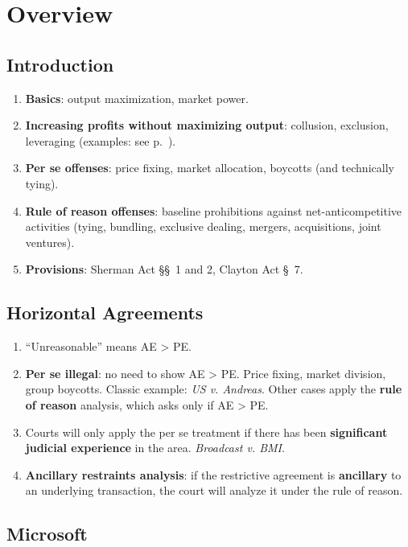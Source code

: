 \section{Overview}

\subsection{Introduction} 

\begin{enumerate}
    \item \textbf{Basics}: output maximization, market power.
    \item \textbf{Increasing profits without maximizing output}: collusion, 
    exclusion, leveraging (examples: see p.~\pageref{sub:conduct-examples}).
    \item \textbf{Per se offenses}: price fixing, market allocation, boycotts 
    (and technically tying).
    \item \textbf{Rule of reason offenses}: baseline prohibitions against 
    net-anticompetitive activities (tying, bundling, exclusive dealing, 
    mergers, acquisitions, joint ventures).
    \item \textbf{Provisions}: Sherman Act \S\S\ 1 and 2, Clayton Act \S\ 7.
\end{enumerate}

\subsection{Horizontal Agreements}

\begin{enumerate}
    \item ``Unreasonable'' means AE > PE.
    \item \textbf{Per se illegal}: no need to show AE > PE. Price fixing, market 
    division, group boycotts. Classic example: \emph{US v. Andreas}.
    Other cases apply the \textbf{rule of reason} 
    analysis, which asks only if AE > PE.
    \item Courts will only apply the per se treatment if there has been 
    \textbf{significant judicial experience} in the area. \emph{Broadcast v. 
    BMI}.
    \item \textbf{Ancillary restraints analysis}: if the restrictive agreement 
    is \textbf{ancillary} to an underlying transaction, the court will analyze 
    it under the rule of reason.
\end{enumerate}

\subsection{Microsoft} %

